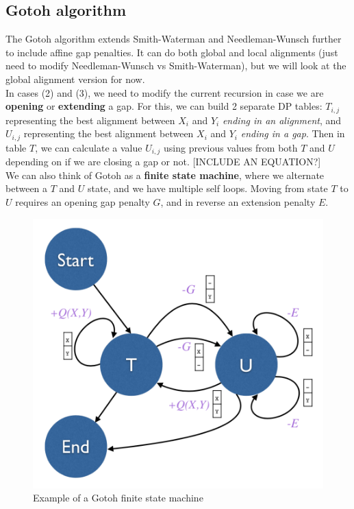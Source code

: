 \documentclass[12pt]{article}
\begin{document}
\subsection{Gotoh algorithm}
The Gotoh algorithm extends Smith-Waterman and Needleman-Wunsch further to include affine gap penalties. It can do both global and local alignments (just need to modify Needleman-Wunsch vs Smith-Waterman), but we will look at the global alignment version for now.\\[10pt]
In cases (2) and (3), we need to modify the current recursion in case we are \textbf{opening} or \textbf{extending} a gap. For this, we can build 2 separate DP tables: $T_{i,j}$ representing the best alignment between $X_i$ and $Y_i$ \textit{ending in an alignment}, and $U_{i,j}$ representing the best alignment between $X_i$ and $Y_i$ \textit{ending in a gap}. Then in table $T$, we can calculate a value $U_{i,j}$ using previous values from both $T$ and $U$ depending on if we are closing a gap or not. [INCLUDE AN EQUATION?]\\[10pt]
We can also think of Gotoh as a \textbf{finite state machine}, where we alternate between a $T$ and $U$ state, and we have multiple self loops. Moving from state $T$ to $U$ requires an opening gap penalty $G$, and in reverse an extension penalty $E$.
\begin{figure}[h]
    \centering
    \includegraphics[width=.6\linewidth]{gotoh_state.png}
    \caption{Example of a Gotoh finite state machine}
    \label{fig:gotoh}
\end{figure}
\end{document}
